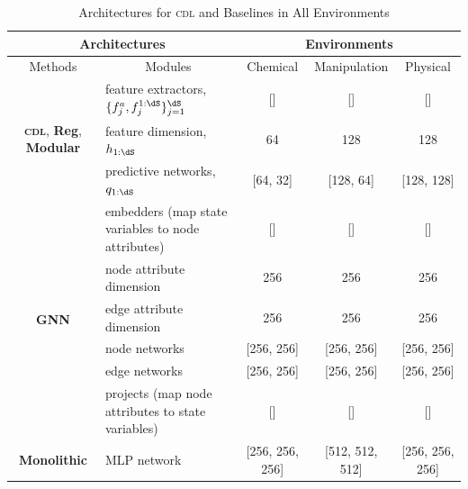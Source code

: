 \begin{table}
\centering
\caption{Architectures for \textsc{cdl} and Baselines in All Environments}
\vspace{-0pt}
\begin{small}
\begin{tabular}{clccc}
\toprule
\multicolumn{2}{c}{\textbf{Architectures}}              & \multicolumn{3}{c}{\textbf{Environments}} \\
\midrule
Methods     & \multicolumn{1}{c}{Modules}               & Chemical  & Manipulation  & Physical\\
\midrule
\multirow{3}{*}{\textbf{\textsc{cdl}}, \textbf{Reg}, \textbf{Modular}} 
& feature extractors, $\{f^a_j, f^{1:\dS}_j\}_{j=1}^\dS$    & []            & []            & []            \\
& feature dimension, $h_{1:\dS}$                            & 64            & 128           & 128           \\
& predictive networks, $q_{1:\dS}$                          & [64, 32]      & [128, 64]     & [128, 128]    \\
\midrule
\multirow{6}{*}{\textbf{GNN}} 
& embedders (map state variables to node attributes)        & []            & []            & []            \\
& node attribute dimension                                  & 256           & 256           & 256           \\
& edge attribute dimension                                  & 256           & 256           & 256           \\
& node networks                                             & [256, 256]    & [256, 256]    & [256, 256]    \\
& edge networks                                             & [256, 256]    & [256, 256]    & [256, 256]    \\
& projects (map node attributes to state variables)         & []            & []            & []            \\
\midrule
\textbf{Monolithic} & MLP network                           & [256, 256, 256]   & [512, 512, 512]   & [256, 256, 256]   \\
\bottomrule
\end{tabular}
\end{small}
\vspace{-0pt}
\label{tab:architecture}
\end{table}


